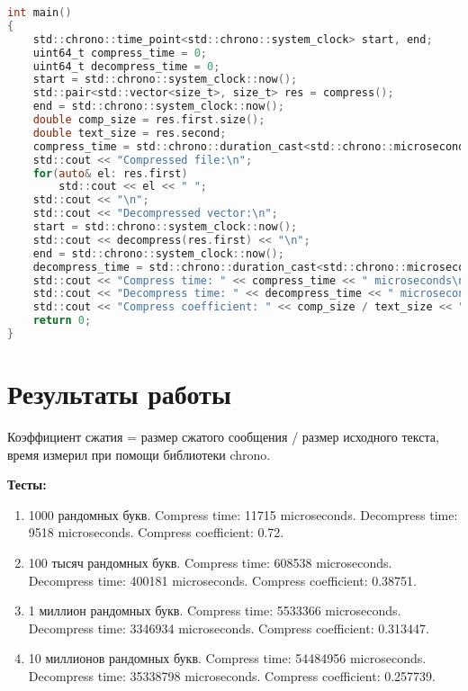 \begin{lstlisting}[language=C]
int main()
{
    std::chrono::time_point<std::chrono::system_clock> start, end;
    uint64_t compress_time = 0;
    uint64_t decompress_time = 0;
    start = std::chrono::system_clock::now();
    std::pair<std::vector<size_t>, size_t> res = compress();
    end = std::chrono::system_clock::now();
    double comp_size = res.first.size();
    double text_size = res.second;
    compress_time = std::chrono::duration_cast<std::chrono::microseconds>(end - start).count();
    std::cout << "Compressed file:\n";
    for(auto& el: res.first)
        std::cout << el << " ";
    std::cout << "\n";
    std::cout << "Decompressed vector:\n";
    start = std::chrono::system_clock::now();
    std::cout << decompress(res.first) << "\n";
    end = std::chrono::system_clock::now();
    decompress_time = std::chrono::duration_cast<std::chrono::microseconds>(end - start).count();
    std::cout << "Compress time: " << compress_time << " microseconds\n";
    std::cout << "Decompress time: " << decompress_time << " microseconds\n";
    std::cout << "Compress coefficient: " << comp_size / text_size << "\n";
    return 0;
}


\end{lstlisting}

\pagebreak

\section{Результаты работы}
Коэффициент сжатия = размер сжатого сообщения / размер исходного текста, время измерил при помощи библиотеки chrono.

\textbf{Тесты:}
\begin{enumerate}
\item 1000 рандомных букв. Compress time: 11715 microseconds. Decompress time: 9518 microseconds. Compress coefficient: 0.72.
\item 100 тысяч рандомных букв. Compress time: 608538 microseconds. Decompress time: 400181 microseconds. Compress coefficient: 0.38751.
\item 1 миллион рандомных букв. Compress time: 5533366 microseconds. Decompress time: 3346934 microseconds. Compress coefficient: 0.313447.
\item 10 миллионов рандомных букв. Compress time: 54484956 microseconds. Decompress time: 35338798 microseconds. Compress coefficient: 0.257739.
\end{enumerate}

\pagebreak